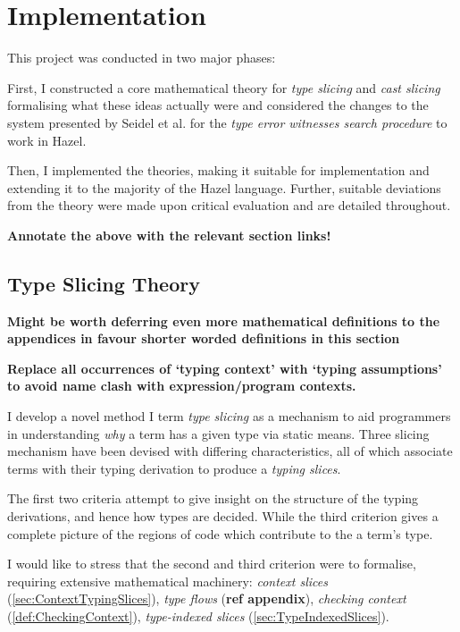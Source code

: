 \chapter{Implementation}\label{chap:Implementation}
This project was conducted in two major phases:

First, I constructed a core mathematical theory for \textit{type slicing} and \textit{cast slicing} formalising what these ideas actually were and considered the changes to the system presented by Seidel et al. for the \textit{type error witnesses search procedure} to work in Hazel.  

Then, I implemented the theories, making it suitable for implementation and extending it to the majority of the Hazel language. Further, suitable deviations from the theory were made upon critical evaluation and are detailed throughout.

\textbf{Annotate the above with the relevant section links!}
\section{Type Slicing Theory}\label{sec:TypeSlicingTheory}
\textbf{Might be worth deferring even more mathematical definitions to the appendices in favour shorter worded definitions in this section}

\textbf{Replace all occurrences of `typing context' with `typing assumptions' to avoid name clash with expression/program contexts.}

I develop a novel method I term \textit{type slicing} as a mechanism to aid programmers in understanding \textit{why} a term has a given type via static means. Three slicing mechanism have been devised with differing characteristics, all of which associate terms with their typing derivation to produce a \textit{typing slices}. 

The first two criteria attempt to give insight on the structure of the typing derivations, and hence how types are decided. While the third criterion gives a complete picture of the regions of code which contribute to the a term's type.

I would like to stress that the second and third criterion were  to formalise, requiring extensive mathematical machinery: \textit{context slices} (\cref{sec:ContextTypingSlices}), \textit{type flows} (\textbf{ref appendix}), \textit{checking context} (\cref{def:CheckingContext}), \textit{type-indexed slices} (\cref{sec:TypeIndexedSlices}).

